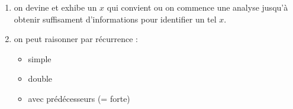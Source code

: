 \begin{enumerate}
    \item{}
    on devine et exhibe un $x$ qui convient ou on commence une analyse jusqu'à obtenir
    suffisament d'informations pour identifier un tel $x$.

    \item{}
    on peut raisonner par récurrence : 
    \begin{itemize}
        \item simple
        \item double
        \item avec prédécesseurs (= forte)
    \end{itemize}
\end{enumerate}
